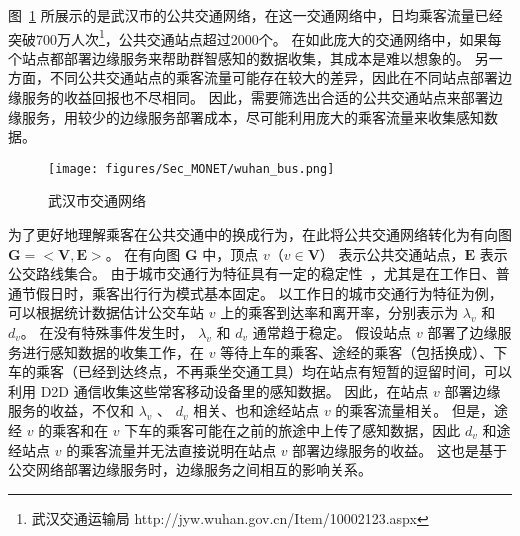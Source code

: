 

图~\ref{Figure_Wuhan_Buses} 所展示的是武汉市的公共交通网络，在这一交通网络中，日均乘客流量已经突破700万人次\footnote{武汉交通运输局 http://jyw.wuhan.gov.cn/Item/10002123.aspx}，公共交通站点超过2000个。
在如此庞大的交通网络中，如果每个站点都部署边缘服务来帮助群智感知的数据收集，其成本是难以想象的。
另一方面，不同公共交通站点的乘客流量可能存在较大的差异，因此在不同站点部署边缘服务的收益回报也不尽相同。
因此，需要筛选出合适的公共交通站点来部署边缘服务，用较少的边缘服务部署成本，尽可能利用庞大的乘客流量来收集感知数据。

\begin{figure}[!h]
  \centering
  \texttt{[image: figures/Sec\_MONET/wuhan\_bus.png]}
  \vspace{-0.5em}
  \caption{武汉市交通网络}
  \vspace{-1em}
  \label{Figure_Wuhan_Buses}
\end{figure}

为了更好地理解乘客在公共交通中的换成行为，在此将公共交通网络转化为有向图 $\boldsymbol{G}=<\boldsymbol{V}, \boldsymbol{E}>$。
在有向图 $\boldsymbol{G}$ 中，顶点 $v$（$v \in \boldsymbol{V}$） 表示公共交通站点，$\boldsymbol{E}$ 表示公交路线集合。
由于城市交通行为特征具有一定的稳定性~\cite{TAO201490}，尤其是在工作日、普通节假日时，乘客出行行为模式基本固定。
以工作日的城市交通行为特征为例，可以根据统计数据估计公交车站 $v$ 上的乘客到达率和离开率，分别表示为 $\lambda_v$ 和 $d_v$。
在没有特殊事件发生时， $\lambda_v$ 和 $d_v$ 通常趋于稳定。
假设站点 $v$ 部署了边缘服务进行感知数据的收集工作，在 $v$ 等待上车的乘客、途经的乘客（包括换成）、下车的乘客（已经到达终点，不再乘坐交通工具）均在站点有短暂的逗留时间，可以利用 D2D 通信收集这些常客移动设备里的感知数据。
因此，在站点 $v$ 部署边缘服务的收益，不仅和 $\lambda_v$ 、 $d_v$ 相关、也和途经站点 $v$ 的乘客流量相关。
但是，途经 $v$ 的乘客和在 $v$ 下车的乘客可能在之前的旅途中上传了感知数据，因此 $d_v$ 和途经站点 $v$ 的乘客流量并无法直接说明在站点 $v$ 部署边缘服务的收益。
这也是基于公交网络部署边缘服务时，边缘服务之间相互的影响关系。

